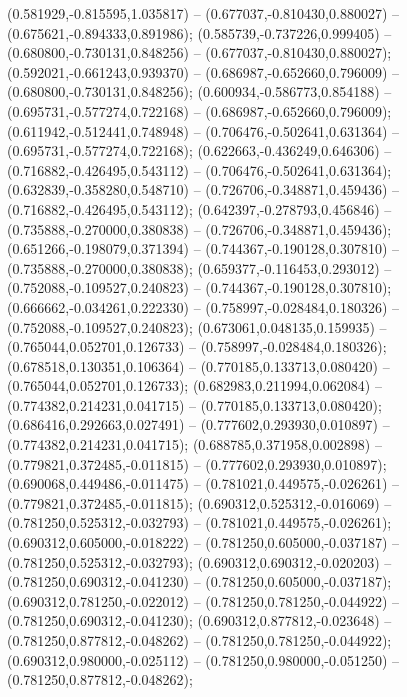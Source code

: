  (0.581929,-0.815595,1.035817) -- (0.677037,-0.810430,0.880027) -- (0.675621,-0.894333,0.891986);
 (0.585739,-0.737226,0.999405) -- (0.680800,-0.730131,0.848256) -- (0.677037,-0.810430,0.880027);
 (0.592021,-0.661243,0.939370) -- (0.686987,-0.652660,0.796009) -- (0.680800,-0.730131,0.848256);
 (0.600934,-0.586773,0.854188) -- (0.695731,-0.577274,0.722168) -- (0.686987,-0.652660,0.796009);
 (0.611942,-0.512441,0.748948) -- (0.706476,-0.502641,0.631364) -- (0.695731,-0.577274,0.722168);
 (0.622663,-0.436249,0.646306) -- (0.716882,-0.426495,0.543112) -- (0.706476,-0.502641,0.631364);
 (0.632839,-0.358280,0.548710) -- (0.726706,-0.348871,0.459436) -- (0.716882,-0.426495,0.543112);
 (0.642397,-0.278793,0.456846) -- (0.735888,-0.270000,0.380838) -- (0.726706,-0.348871,0.459436);
 (0.651266,-0.198079,0.371394) -- (0.744367,-0.190128,0.307810) -- (0.735888,-0.270000,0.380838);
 (0.659377,-0.116453,0.293012) -- (0.752088,-0.109527,0.240823) -- (0.744367,-0.190128,0.307810);
 (0.666662,-0.034261,0.222330) -- (0.758997,-0.028484,0.180326) -- (0.752088,-0.109527,0.240823);
 (0.673061,0.048135,0.159935) -- (0.765044,0.052701,0.126733) -- (0.758997,-0.028484,0.180326);
 (0.678518,0.130351,0.106364) -- (0.770185,0.133713,0.080420) -- (0.765044,0.052701,0.126733);
 (0.682983,0.211994,0.062084) -- (0.774382,0.214231,0.041715) -- (0.770185,0.133713,0.080420);
 (0.686416,0.292663,0.027491) -- (0.777602,0.293930,0.010897) -- (0.774382,0.214231,0.041715);
 (0.688785,0.371958,0.002898) -- (0.779821,0.372485,-0.011815) -- (0.777602,0.293930,0.010897);
 (0.690068,0.449486,-0.011475) -- (0.781021,0.449575,-0.026261) -- (0.779821,0.372485,-0.011815);
 (0.690312,0.525312,-0.016069) -- (0.781250,0.525312,-0.032793) -- (0.781021,0.449575,-0.026261);
 (0.690312,0.605000,-0.018222) -- (0.781250,0.605000,-0.037187) -- (0.781250,0.525312,-0.032793);
 (0.690312,0.690312,-0.020203) -- (0.781250,0.690312,-0.041230) -- (0.781250,0.605000,-0.037187);
 (0.690312,0.781250,-0.022012) -- (0.781250,0.781250,-0.044922) -- (0.781250,0.690312,-0.041230);
 (0.690312,0.877812,-0.023648) -- (0.781250,0.877812,-0.048262) -- (0.781250,0.781250,-0.044922);
 (0.690312,0.980000,-0.025112) -- (0.781250,0.980000,-0.051250) -- (0.781250,0.877812,-0.048262);
